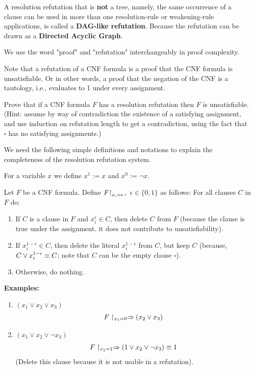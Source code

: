 A resolution refutation that is \textbf{not} a tree, namely, the same occurrence of a clause can be used in more than one resolution-rule or weakening-rule applications, is called a \textbf{DAG-like refutation}. Because the refutation can be drawn as a \textbf{Directed Acyclic Graph}.


\begin{remark}
We use the word "proof" and "refutation" interchangeably in proof complexity.
\end{remark}

Note that a refutation of a CNF formula is a proof that the CNF formula  is unsatisfiable. Or in other words, a proof that the negation of the CNF is a tautology, i.e., evaluates to 1 under every assignment.

\begin{exercise}
Prove that if a CNF formula $F$ has a resolution refutation then $F$ is unsatisfiable. 
(Hint: assume by way of contradiction the existence of a satisfying assignment, and use induction on refutation  length to get a contradiction, using the fact that $\square$ has no satisfying assignments.)
\end{exercise}




We need the following simple definitions and notations to explain the completeness of the resolution refutation system.

For a variable $x$ we define $x^1 := x$ and $x^0 := \neg x$.
 

\begin{definition}
Let $F$ be a CNF formula.
Define $F{\upharpoonright}_{x_i = \epsilon}$, $~\epsilon \in \{0,1\}$ as follows:
For all clauses $C$ in $F$ do:
\begin{enumerate}
    \item If $C$ is a clause in $F$ and $x_i^\epsilon \in C$, then delete $C$ from $F$ (because the clause is true under the assignment, it does not contribute to unsatisfiability).
    \item If $x_i^{1-\epsilon} \in C$, then delete the literal $x_i^{1-\epsilon}$ from $C$, but keep $C$ (because, $C\lor x_i^{1-\epsilon}\equiv C$; note that $C$ can be the empty clause $\square $). 
    \item Otherwise, do nothing.
\end{enumerate}
\end{definition}

\textbf{Examples:}
\begin{enumerate}
    \item $(x_1 \lor x_2 \lor x_3)$  
    \[
    F\upharpoonright_{x_1 = 0} \Rightarrow (x_2 \lor x_3)
    \]

    \item $(x_1 \lor x_2 \lor \neg x_3)$  
    \[
    F\upharpoonright_{x_1 = 1} \Rightarrow (1\lor x_2 \lor \neg x_3)\equiv 1
    \]
    (Delete this clause  because it is not usable in a refutation).
\end{enumerate}

